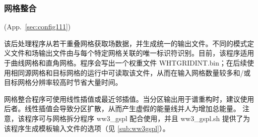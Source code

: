 \vsssub
\subsubsection{网格整合} \label{sub:ww3gint}
\vsssub
{}
 (App.~\ref{sec:config111})

\vspace{\baselineskip}
\noindent
该后处理程序从若干重叠网格获取场数据，并生成统一的输出文件。不同的模式定义文件和场输出文件由与每个特定网格关联的唯一标识符识别。目前，该程序适用于曲线网格和直角网格。程序会写出一个权重文件 {\file WHTGRIDINT.bin}；在后续使用相同源网格和目标网格的运行中可读取该文件，从而在输入网格数量较多和/或目标网格分辨率较高时节省大量时间。

\vspace{\baselineskip}
\noindent
网格整合程序可使用线性插值或最近邻插值。当分区输出用于谱重构时，建议使用后者。线性插值会导致分区扩散，从而产生虚假的能量线并人为增加总能量。
\vspace{\baselineskip}
\vspace{\baselineskip}
\noindent
注意，该程序可与网格拆分程序 {\file ww3\_gspl} 配合使用，并且 {\file ww3\_gspl.sh} 提供了为该程序生成模板输入文件的选项（见 \para\ref{sub:ww3gspl}）。

\pb
